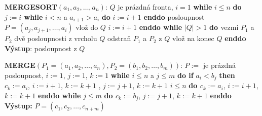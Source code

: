 \documentclass[a4paper,12pt]{article}
\begin{document}
{\bf MERGESORT$(a_1,a_2,\dots,a_n)$}:\newline 
$Q$ je pr\'azdn\'a fronta, $i=1$\newline 
{\bf while} $i\le n$ {\bf do\newline 
\phantom{{\rm ---}}$j:=i$\newline 
\phantom{{\rm ---}}while} $i<n$ a $a_{i+1}>a_i$ {\bf do} $i:=i+1$ {\bf enddo\newline 
\phantom{{\rm ---}}}posloupnost $P=(a_j,a_{j+1},\dots,a_i)$ vlo\v z do $
Q$\newline 
\phantom{---}$i:=i+1$\newline 
{\bf enddo\newline 
while} $|Q|>1$ {\bf do\newline 
\phantom{{\rm ---}}$ $}vezmi $P_1$ a $P_2$ dv\v e posloupnosti z vrcholu $
Q$\newline 
\phantom{---}odstra\v n $P_1$ a $P_2$ z $Q$\newline 
\phantom{---}{\bf MERGE$(P_1,P_2)$} vlo\v z na konec $Q$\newline 
{\bf enddo\newline 
V\'ystup}: posloupnost z $Q$
\bigskip

{\bf MERGE$(P_1=(a_1,a_2,\dots,a_n),P_2=(b_1,b_2,\dots,b_m))$}:\newline 
$P:=$ je pr\'azdn\'a posloupnost, $i:=1$, $j:=1$, $k:=1$\newline 
{\bf while} $i\le n$ a $j\le m$ {\bf do\newline 
\phantom{{\rm ---}}if} $a_i<b_j$ {\bf then\newline 
\phantom{{\rm ------}}$c_k:=a_i$}, $i:=i+1$, $k:=k+1$\newline 
{}, $j:=j+1$, $k:=k+1$\newline 
\phantom{---}{\bf endif\newline 
enddo\newline 
while} $i\le n$ {\bf do\newline 
\phantom{{\rm ---}}$c_k:=a_i$}, $i:=i+1$, $k:=k+1$\newline 
{\bf enddo\newline 
while} $j\le m$ {\bf do\newline 
\phantom{{\rm ---}}$c_k:=b_j$}, $j:=j+1$, $k:=k+1$\newline 
{\bf enddo\newline 
V\'ystup:} $P=(c_1,c_2,\dots,c_{n+m})$
\bigskip
\end{document}
